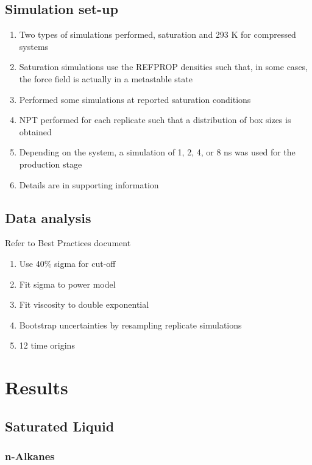 \documentclass[11pt,a4paper]{article}
\begin{document}
\subsection{Simulation set-up}

\begin{enumerate}
	\item Two types of simulations performed, saturation and 293 K for compressed systems
	\item Saturation simulations use the REFPROP densities such that, in some cases, the force field is actually in a metastable state
	\item Performed some simulations at reported saturation conditions
	\item NPT performed for each replicate such that a distribution of box sizes is obtained
	\item Depending on the system, a simulation of 1, 2, 4, or 8 ns was used for the production stage
	\item Details are in supporting information
\end{enumerate}

\subsection{Data analysis}

Refer to Best Practices document

\begin{enumerate}
	\item Use 40\% sigma for cut-off
	\item Fit sigma to power model
	\item Fit viscosity to double exponential
	\item Bootstrap uncertainties by resampling replicate simulations
	\item 12 time origins
\end{enumerate}

\section{Results}

\subsection{Saturated Liquid}

\subsubsection{n-Alkanes}
\end{document}
